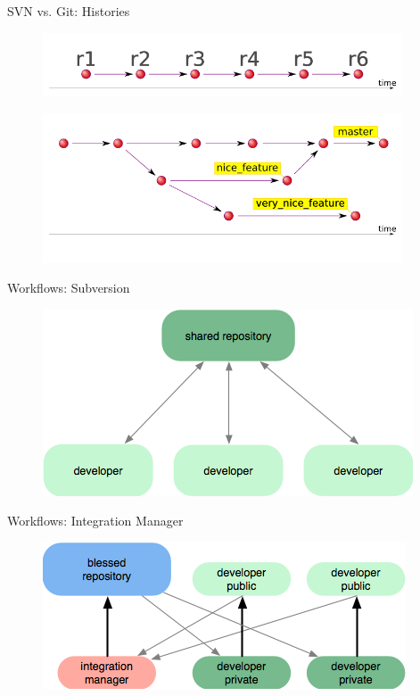 \documentclass{beamer}
\begin{document}
\begin{frame}{SVN vs. Git: Histories}

  \begin{figure}
   \includegraphics[width=0.95\textwidth]{./images/svn-timeline.png}
  \end{figure}

  \begin{figure}
   \includegraphics[width=0.95\textwidth]{./images/git-timeline.png}
  \end{figure}

\end{frame}



\begin{frame}{Workflows: Subversion}

  \begin{figure}
     \includegraphics[scale=1.0]{./images/workflow-svn.png}
  \end{figure}

\end{frame}

\begin{frame}{Workflows: Integration Manager}
 
  \begin{figure}
     \includegraphics[scale=1.0]{./images/workflow-integration-manager.png}
  \end{figure}

\end{frame}
\end{document}
